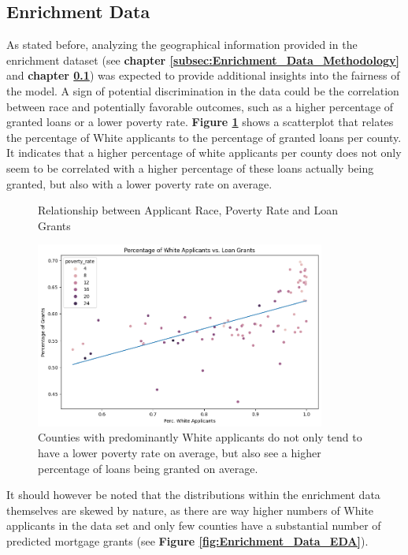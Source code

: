 \subsection{Enrichment Data}\label{subsec:Enrichment_Data}

As stated before, analyzing the geographical information provided in the enrichment dataset (see \textbf{chapter \ref{subsec:Enrichment_Data_Methodology}} and \textbf{chapter \ref{subsec:Enrichment_Data}}) was expected to provide additional insights into the fairness of the model.
A sign of potential discrimination in the data could be the correlation between race and potentially favorable outcomes, such as a higher percentage of granted loans or a lower poverty rate.
\textbf{Figure \ref{fig:Scatter_White_Applicants_Loan_Grant}} shows a scatterplot that relates the percentage of White applicants to the percentage of granted loans per county. It indicates that a higher percentage of white applicants per county does not only seem to be correlated with a higher percentage of these loans actually being granted, but also with a lower poverty rate on average.

\begin{figure}[h]
    \centering
    \caption{Relationship between Applicant Race, Poverty Rate and Loan Grants}
    \includegraphics[width=0.85\textwidth]{images/CHXX_Perc_Grants_vs_Perc_White.png}
    \caption*{Counties with predominantly White applicants do not only tend to have a lower poverty rate on average, but also see a higher percentage of loans being granted on average.}
    \label{fig:Scatter_White_Applicants_Loan_Grant}
\end{figure}

It should however be noted that the distributions within the enrichment data themselves are skewed by nature, as there are way higher numbers of White applicants in the data set and only few counties have a substantial number of predicted mortgage grants (see \textbf{Figure \ref{fig:Enrichment_Data_EDA}}).

